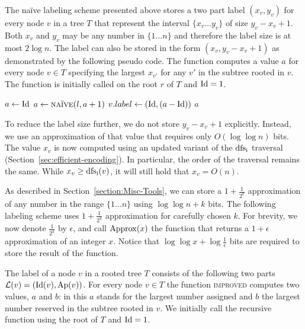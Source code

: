 The  na\"ive labeling scheme presented above stores a two part label  $(x_v,y_v)$ for every node $v$ in a tree $T$ that represent the  interval $\{x_v \dots y_v\}$ of size $y_v-x_v+1$. Both  $x_v$ and $y_v$ may be any number in  $\{1 \dots n\}$ and therefore the label size is at most $2\log n$. The label  can also be stored in the form $(x_v,y_v-x_v+1)$ as demonstrated by the following pseudo code. 
The function computes a value $a$   for every node $v \in T$ specifying the largest $x_{v'}$ for any $v'$  in the subtree rooted in $v$. 
The function is initially called on  the root $r$  of $T$ and $\operatorname{Id}= 1$. 

\begin{algorithmic}[1] 
        \State $a \gets \operatorname{Id}$	
	\State $a \gets  \Call{na\"ive}{l,a+1}$ 
	\EndFor
	\State $v.label \gets (\operatorname{Id},(a-\operatorname{Id}))$ 
	\State \Return $a$  
\EndFunction
\end{algorithmic}


To reduce the label size further, we do not store $y_v-x_v+1$ explicitly. 
Instead, we use  an approximation  of that value that  requires only $O(\log \log n)$ bits. 
The value $x_v$ is now computed using an updated variant of the $\operatorname{dfs_i}$ traversal (Section~\ref{sec:efficient-encoding}).
In particular, the order of the traversal remains the same.
While $x_v \geq \operatorname{dfs_i}(v)$, it will  still hold that $x_v = O(n)$.

 As described in  Section~\ref{section:Misc-Tools}, we can store a $1+\frac{1}{2^k}$ approximation of any number in the range $\{1 \dots n\}$ using   $\log  \log n + k$ bits. The following labeling scheme uses $1+\frac{1}{2^k}$ approximation for carefully  chosen $k$.  For brevity, we now  denote $\frac{1}{2^k}$ by  $\epsilon$, and call $\operatorname{Approx}(x)$ the function that returns a $1+\epsilon$ approximation of an integer $x$.
Notice that  $ \log \log  x + \log\frac{1}{\epsilon}$ bits are required  to store the result of the function.

The label of a node $v$ in a rooted tree $T$ consists of the following two parts  $ \mathcal{L}(v) = (\operatorname{Id}(v), \operatorname{Ap}(v))$.
For every node $v \in T$ the function \textsc{improved}  computes  two values, $a$ and $b$: in this $a$ stands for the largest number assigned and $b$ the largest number reserved  in the subtree rooted in $v$.
We initially call the  recursive  function using  the root of $T$ and $\operatorname{Id} = 1$. 

